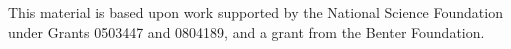 \noindent

\bigskip\noindent
This material is based upon work supported by the National Science
Foundation under
Grants 0503447 and 0804189, and a grant from the Benter Foundation.

\bigskip\noindent\svninfo 


\bigskip\noindent


\smallskip
\newpage

